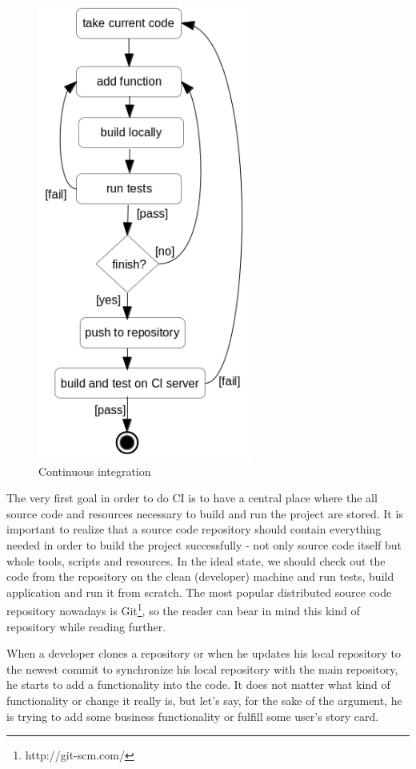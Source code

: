 \documentclass[12pt,final,oneside]{fithesis}
\begin{document}
\begin{figure}
	\centering
	\includegraphics[width=70mm]{img/ci.png}
	\caption{Continuous integration}
	\label{fig:ci_process}
\end{figure}

\newpage

The very first goal in order to do CI is to have a central place where the all source code and resources necessary to build and run the project are stored. It is important to realize that a source code repository should contain everything needed in order to build the project successfully - not only source code itself but whole tools, scripts and resources. In the ideal state, we should check out the code from the repository on the clean (developer) machine and run tests, build application and run it from scratch. The most popular distributed source code repository nowadays is Git\footnote{http://git-scm.com/}, so the reader can bear in mind this kind of repository while reading further.

When a developer clones a repository or when he updates his local repository to the newest commit to synchronize his local repository with the main repository, he starts to add a functionality into the code. It does not matter what kind of functionality or change it really is, but let's say, for the sake of the argument, he is trying to add some business functionality or fulfill some user's story card.
\end{document}
